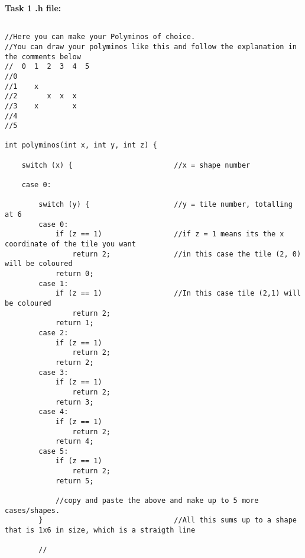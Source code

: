 \documentclass[11pt]{amsart}
\begin{document}
\textbf{Task 1 .h file:}

\begin{verbatim}

//Here you can make your Polyminos of choice.
//You can draw your polyminos like this and follow the explanation in the comments below
//	0  1  2  3	4  5
//0
//1    x
//2       x  x  x
//3    x        x
//4
//5

int polyminos(int x, int y, int z) {

	switch (x) {						//x = shape number

	case 0:

		switch (y) {					//y = tile number, totalling at 6
		case 0:
			if (z == 1)					//if z = 1 means its the x coordinate of the tile you want
				return 2;				//in this case the tile (2, 0) will be coloured
			return 0;
		case 1:
			if (z == 1)					//In this case tile (2,1) will be coloured
				return 2;
			return 1;
		case 2:
			if (z == 1)
				return 2;
			return 2;
		case 3:
			if (z == 1)
				return 2;
			return 3;
		case 4:
			if (z == 1)
				return 2;
			return 4;
		case 5:
			if (z == 1)
				return 2;
			return 5;

			//copy and paste the above and make up to 5 more cases/shapes.
		}								//All this sums up to a shape that is 1x6 in size, which is a straigth line

		//

		\end{verbatim}
\end{document}
